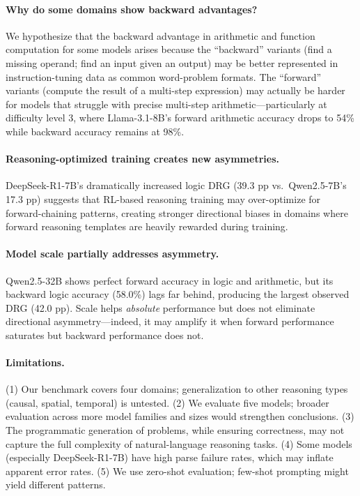 \documentclass{article}
\begin{document}
\paragraph{Why do some domains show backward advantages?}
We hypothesize that the backward advantage in arithmetic and function computation for some models arises because the ``backward'' variants (find a missing operand; find an input given an output) may be better represented in instruction-tuning data as common word-problem formats. The ``forward'' variants (compute the result of a multi-step expression) may actually be harder for models that struggle with precise multi-step arithmetic---particularly at difficulty level 3, where Llama-3.1-8B's forward arithmetic accuracy drops to 54\% while backward accuracy remains at 98\%.

\paragraph{Reasoning-optimized training creates new asymmetries.}
DeepSeek-R1-7B's dramatically increased logic DRG (39.3 pp vs.\ Qwen2.5-7B's 17.3 pp) suggests that RL-based reasoning training may over-optimize for forward-chaining patterns, creating stronger directional biases in domains where forward reasoning templates are heavily rewarded during training.

\paragraph{Model scale partially addresses asymmetry.}
Qwen2.5-32B shows perfect forward accuracy in logic and arithmetic, but its backward logic accuracy (58.0\%) lags far behind, producing the largest observed DRG (42.0 pp). Scale helps \emph{absolute} performance but does not eliminate directional asymmetry---indeed, it may amplify it when forward performance saturates but backward performance does not.

\paragraph{Limitations.}
(1) Our benchmark covers four domains; generalization to other reasoning types (causal, spatial, temporal) is untested. (2) We evaluate five models; broader evaluation across more model families and sizes would strengthen conclusions. (3) The programmatic generation of problems, while ensuring correctness, may not capture the full complexity of natural-language reasoning tasks. (4) Some models (especially DeepSeek-R1-7B) have high parse failure rates, which may inflate apparent error rates. (5) We use zero-shot evaluation; few-shot prompting might yield different patterns.
\end{document}
